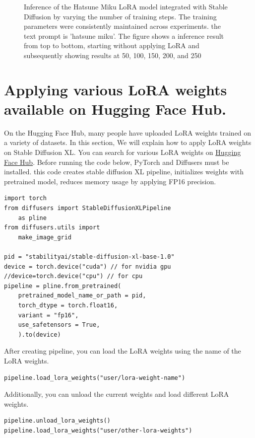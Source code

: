 \documentclass[extendedabs]{bmvc2k}
\begin{document}
\begin{figure}[t]
	\caption{
		Inference of the Hatsune Miku LoRA model integrated with Stable Diffusion by varying the number of training steps. The training parameters were consistently maintained across experiments. the text prompt is 'hatsune miku'. The figure shows a inference result from top to bottom, starting without applying LoRA and subsequently showing results at 50, 100, 150, 200, and 250}
	\vspace{-2mm}
        \label{fig:mikuresult}
\end{figure}

\newpage

\appendix
\section{Applying various LoRA weights available on Hugging Face Hub.}

On the Hugging Face Hub, many people have uploaded LoRA weights trained on a variety of datasets. In this section, We will explain how to apply LoRA weights on Stable Diffusion XL. 
You can search for various LoRA weights on \href{https://huggingface.co/models?other=base_model:stabilityai/stable-diffusion-xl-base-1.0}{Hugging Face Hub}. Before running the code below, PyTorch and Diffusers must be installed. this code creates stable diffusion XL pipeline, initializes weights with pretrained model, reduces memory usage by applying FP16 precision.

\begin{verbatim}
import torch
from diffusers import StableDiffusionXLPipeline
    as pline
from diffusers.utils import
    make_image_grid

pid = "stabilityai/stable-diffusion-xl-base-1.0"
device = torch.device("cuda") // for nvidia gpu
//device=torch.device("cpu") // for cpu
pipeline = pline.from_pretrained(
    pretrained_model_name_or_path = pid,
    torch_dtype = torch.float16,
    variant = "fp16",
    use_safetensors = True,
    ).to(device)

\end{verbatim}
After creating pipeline, you can load the LoRA weights using the name of the LoRA weights.
\begin{verbatim}
pipeline.load_lora_weights("user/lora-weight-name")
\end{verbatim}

Additionally, you can unload the current weights and load different LoRA weights.

\begin{verbatim}
pipeline.unload_lora_weights()
pipeline.load_lora_weights("user/other-lora-weights")
\end{verbatim}
\end{document}
